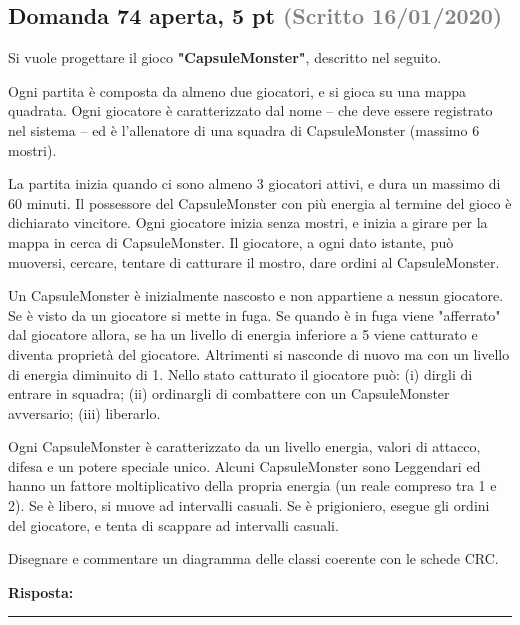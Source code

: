 \documentclass[a4paper,11pt]{article}
\begin{document}
\subsection*{Domanda 74 \hfill {\small aperta, 5 pt \textcolor{gray}{(Scritto 16/01/2020)}}}
\begin{tcolorbox}[colback=gray!8,colframe=gray!50,title=Contesto]
Si vuole progettare il gioco \textbf{"CapsuleMonster"}, descritto nel seguito.

Ogni partita è composta da almeno due giocatori, e si gioca su una mappa quadrata. Ogni giocatore è caratterizzato dal nome – che deve essere registrato nel sistema – ed è l'allenatore di una squadra di CapsuleMonster (massimo 6 mostri).

La partita inizia quando ci sono almeno 3 giocatori attivi, e dura un massimo di 60 minuti. Il possessore del CapsuleMonster con più energia al termine del gioco è dichiarato vincitore. Ogni giocatore inizia senza mostri, e inizia a girare per la mappa in cerca di CapsuleMonster. Il giocatore, a ogni dato istante, può muoversi, cercare, tentare di catturare il mostro, dare ordini al CapsuleMonster.

Un CapsuleMonster è inizialmente nascosto e non appartiene a nessun giocatore. Se è visto da un giocatore si mette in fuga. Se quando è in fuga viene "afferrato" dal giocatore allora, se ha un livello di energia inferiore a 5 viene catturato e diventa proprietà del giocatore. Altrimenti si nasconde di nuovo ma con un livello di energia diminuito di 1. Nello stato catturato il giocatore può: (i) dirgli di entrare in squadra; (ii) ordinargli di combattere con un CapsuleMonster avversario; (iii) liberarlo.

Ogni CapsuleMonster è caratterizzato da un livello energia, valori di attacco, difesa e un potere speciale unico. Alcuni CapsuleMonster sono Leggendari ed hanno un fattore moltiplicativo della propria energia (un reale compreso tra 1 e 2). Se è libero, si muove ad intervalli casuali. Se è prigioniero, esegue gli ordini del giocatore, e tenta di scappare ad intervalli casuali.
\end{tcolorbox}
Disegnare e commentare un diagramma delle classi coerente con le schede CRC.

\vspace{0.2cm}
\noindent\textbf{Risposta:}\par
\vspace{4cm}\hrule


\end{document}
